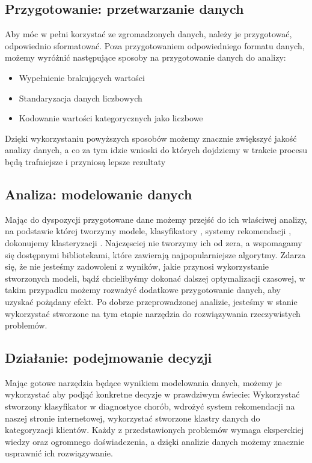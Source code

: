 \documentclass{book}
\begin{document}
\subsection{Przygotowanie: przetwarzanie danych}
Aby móc w pełni korzystać ze zgromadzonych danych, 
należy je przygotować, odpowiednio sformatować. 
Poza przygotowaniem odpowiedniego formatu danych, 
możemy wyróżnić następujące sposoby na przygotowanie danych do analizy:
\begin{itemize}
    \item Wypełnienie brakujących wartości 
    \item Standaryzacja danych liczbowych
    \item Kodowanie wartości kategorycznych jako liczbowe
  \end{itemize}
Dzięki wykorzystaniu powyższych sposobów możemy znacznie zwiększyć jakość analizy danych, 
a co za tym idzie wnioski do których dojdziemy w trakcie procesu będą 
trafniejsze i przyniosą lepsze rezultaty


\subsection{Analiza: modelowanie danych}
Mając do dyspozycji przygotowane dane możemy przejść do ich właściwej analizy, 
na podstawie której tworzymy modele, klasyfikatory \cite{classifiers}, systemy rekomendacji 
\cite{recomendation_systems}, dokonujemy klasteryzacji \cite{clustering}. 
Najczęsciej nie tworzymy ich od zera, a wspomagamy się dostępnymi bibliotekami, które zawierają 
najpopularniejsze algorytmy. Zdarza się, że nie jesteśmy zadowoleni z wyników, jakie przynosi 
wykorzystanie stworzonych modeli, bądź chcielibyśmy dokonać dalszej optymalizacji czasowej, 
w takim przypadku możemy rozważyć dodatkowe przygotowanie danych, aby uzyskać pożądany efekt.
Po dobrze przeprowadzonej analizie, jesteśmy w stanie 
wykorzystać stworzone na tym etapie narzędzia do rozwiązywania rzeczywistych problemów.

\subsection{Działanie: podejmowanie decyzji}
Mając gotowe narzędzia będące wynikiem modelowania danych, możemy je wykorzystać aby podjąć 
konkretne decyzje w prawdziwym świecie: Wykorzystać stworzony 
klasyfikator w diagnostyce chorób, wdrożyć system rekomendacji 
na naszej stronie internetowej, wykorzystać stworzone klastry danych do kategoryzacji klientów. 
Każdy z przedstawionych problemów wymaga eksperckiej wiedzy oraz ogromnego doświadczenia, 
a dzięki analizie danych możemy znacznie usprawnić ich rozwiązywanie.
\end{document}

